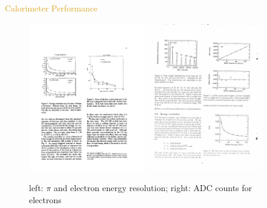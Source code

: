 \begin{frame}{\textcolor{Goldenrod}{Calorimeter Performance}}
  \begin{figure} \centering
    \includegraphics[width=0.45\textwidth]{Images/40_CAL_performance_02.pdf}
    \includegraphics[width=0.45\textwidth]{Images/40_CAL_performance_01.pdf}
    \caption*{{\scriptsize left: $\pi$ and electron energy resolution; right: ADC
          counts for electrons}}
  \end{figure}
\end{frame}  

